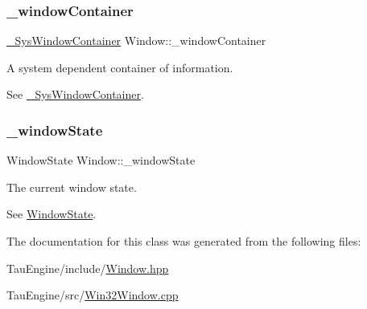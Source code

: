 \subsubsection{\texorpdfstring{\+\_\+window\+Container}{\_windowContainer}}
{\footnotesize\ttfamily \mbox{\hyperlink{struct___sys_window_container}{\+\_\+\+Sys\+Window\+Container}} Window\+::\+\_\+window\+Container\hspace{0.3cm}{\ttfamily [private]}}

A system dependent container of information.

See \mbox{\hyperlink{struct___sys_window_container}{\+\_\+\+Sys\+Window\+Container}}. \mbox{\label{class_window_a43c5622f0faf50873784dceb427e4e4f}} 
\subsubsection{\texorpdfstring{\+\_\+window\+State}{\_windowState}}
{\footnotesize\ttfamily Window\+State Window\+::\+\_\+window\+State\hspace{0.3cm}{\ttfamily [private]}}

The current window state.

See \mbox{\hyperlink{}{Window\+State}}. 

The documentation for this class was generated from the following files\+:\begin{DoxyCompactItemize}
\item 
Tau\+Engine/include/\mbox{\hyperlink{_window_8hpp}{Window.\+hpp}}\item 
Tau\+Engine/src/\mbox{\hyperlink{_win32_window_8cpp}{Win32\+Window.\+cpp}}\end{DoxyCompactItemize}
